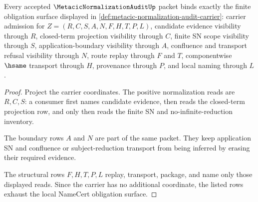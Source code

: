 \begin{theorem}
\label{thm:metacic-normalization-audit-obligation-surface}
Every accepted $\MetacicNormalizationAuditUp$ packet binds exactly the finite obligation surface displayed in \autoref{def:metacic-normalization-audit-carrier}: carrier admission for $Z=(R,C,S,A,N,F,H,T,P,L)$, candidate evidence visibility through $R$, closed-term projection visibility through $C$, finite SN scope visibility through $S$, application-boundary visibility through $A$, confluence and transport refusal visibility through $N$, route replay through $F$ and $T$, componentwise $\hsame$ transport through $H$, provenance through $P$, and local naming through $L$.
\end{theorem}
\begin{proof}
Project the carrier coordinates. The positive normalization reads are $R,C,S$: a consumer first names candidate evidence, then reads the closed-term projection row, and only then reads the finite SN and no-infinite-reduction inventory.

The boundary rows $A$ and $N$ are part of the same packet. They keep application SN and confluence or subject-reduction transport from being inferred by erasing their required evidence.

The structural rows $F,H,T,P,L$ replay, transport, package, and name only those displayed reads. Since the carrier has no additional coordinate, the listed rows exhaust the local NameCert obligation surface.
\end{proof}

